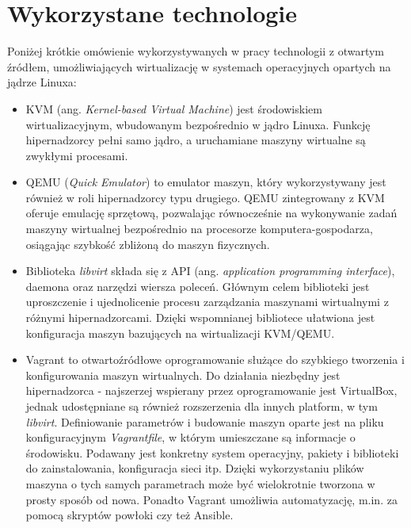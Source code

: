 \section{Wykorzystane technologie}
Poniżej krótkie omówienie wykorzystywanych w pracy technologii z otwartym źródłem, umożliwiających wirtualizację w systemach operacyjnych opartych na jądrze Linuxa:
\begin{itemize}
    \item KVM (ang. \textit{Kernel-based Virtual Machine}) \cite{kvm} jest środowiskiem wirtualizacyjnym, wbudowanym bezpośrednio w jądro Linuxa. Funkcję hipernadzorcy pełni samo jądro, a uruchamiane maszyny wirtualne są zwykłymi procesami. 
    
    \item QEMU (\textit{Quick Emulator}) \cite{qemu} to emulator maszyn, który wykorzystywany jest również w roli hipernadzorcy typu drugiego. QEMU zintegrowany z KVM oferuje emulację sprzętową, pozwalając równocześnie na wykonywanie zadań maszyny wirtualnej bezpośrednio na procesorze komputera-gospodarza, osiągając szybkość zbliżoną do maszyn fizycznych. 

    \item Biblioteka \textit{libvirt} \cite{libvirt} składa się z API (ang. \textit{application programming interface}), daemona oraz narzędzi wiersza poleceń. Głównym celem biblioteki jest uproszczenie i ujednolicenie procesu zarządzania maszynami wirtualnymi z różnymi hipernadzorcami. Dzięki wspomnianej bibliotece ułatwiona jest konfiguracja maszyn bazujących na wirtualizacji KVM/QEMU.

    \item Vagrant \cite{vagrant} to otwartoźródłowe oprogramowanie służące do szybkiego tworzenia i konfigurowania maszyn wirtualnych. Do działania niezbędny jest hipernadzorca - najszerzej wspierany przez oprogramowanie jest VirtualBox, jednak udostępniane są również rozszerzenia dla innych platform, w tym \textit{libvirt}. Definiowanie parametrów i budowanie maszyn oparte jest na pliku konfiguracyjnym \textit{Vagrantfile}, w którym umieszczane są informacje o środowisku. Podawany jest konkretny system operacyjny, pakiety i biblioteki do zainstalowania, konfiguracja sieci itp. Dzięki wykorzystaniu plików maszyna o tych samych parametrach może być wielokrotnie tworzona w prosty sposób od nowa. Ponadto Vagrant umożliwia automatyzację, m.in. za pomocą skryptów powłoki czy też Ansible.
\end{itemize}



